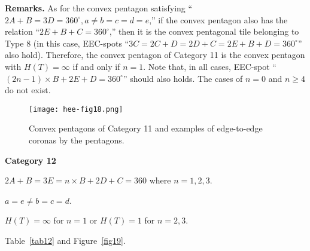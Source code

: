 \documentclass[11pt, a4paper]{article}
\begin{document}
\noindent
\textbf{Remarks.} As for the convex pentagon satisfying 
``$2A + B = 3D = 360^ \circ , a \ne b = c = d = e$,'' if the convex pentagon 
also has the relation ``$2E+B+C = 360^ \circ$,'' then it is the convex pentagonal 
tile belonging to Type 8 (in this case, EEC-spots 
``$3C = 2C+D = 2D+C = 2E+B+D = 360^ \circ$'' also hold). 
Therefore, the convex pentagon of Category 11 is the convex pentagon with 
$H(T) = \infty $ if and only if $n = 1$. Note that, in all cases, EEC-spot 
``$(2n - 1)\times B + 2E + D = 360^ \circ $'' should also holds. The cases 
of $n=0$ and $n \ge 4$ do not exist.





\renewcommand{\figurename}{{\small Figure.}}
\begin{figure}[htbp]
 \centering\texttt{[image: hee-fig18.png]} 
  \caption{{\small 
Convex pentagons of Category 11 and examples of edge-to-edge coronas 
by the pentagons.
} 
\label{fig18}
}
\end{figure}















\bigskip\bigskip
\bigskip\bigskip

\bigskip\bigskip
\noindent
\textbf{Category 12}

\begin{description}
 \setlength{\itemindent}{-10pt}
 \setlength{\itemsep}{-3pt} 
\item[Angle relation:] $2A+B = 3E= n \times B+2D+C = 360$ where $n = 1, 2, 3$.

\item[Edge relation:] $a = e \ne b = c = d$.

\item[Heesch number:] $H(T) = \infty$ for $n=1$ or $H(T) = 1$ for $n = 2, 3$.

\item[Corresponding Table and Figure:] Table~\ref{tab12} and Figure~\ref{fig19}.
\end{description}
\end{document}
